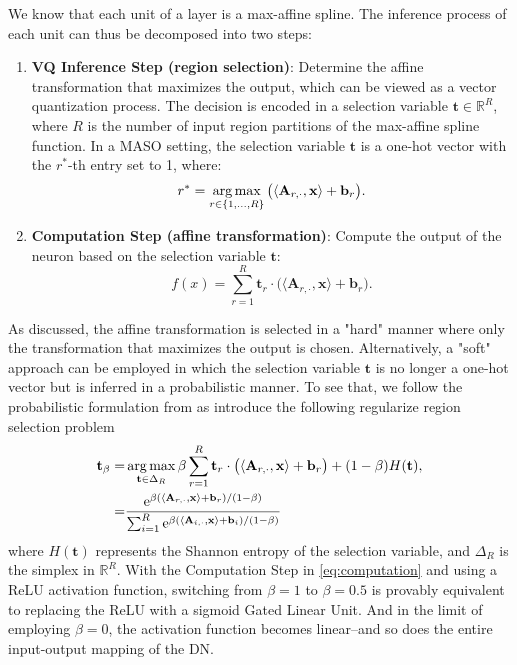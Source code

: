 We know that each unit of a layer is a max-affine spline. The inference process of each unit can thus be decomposed into two steps:
\begin{enumerate}
    \item \textbf{VQ Inference Step (region selection)}: Determine the affine transformation that maximizes the output, which can be viewed as a vector quantization process. The decision is encoded in a selection variable $\mathbf{t} \in \mathbb{R}^R$, where $R$ is the number of input region partitions of the max-affine spline function. In a MASO setting, the selection variable $\mathbf{t}$ is a one-hot vector with the $r^*$-th entry set to 1, where:
    \begin{equation}
        r^* = \operatorname*{arg\,max}_{r \in \{1, \dots, R\}} \big( \langle \mathbf{A}_{r,\cdot}, \mathbf{x} \rangle + \mathbf{b}_r \big).
    \end{equation}
    \item \textbf{Computation Step (affine transformation)}: Compute the output of the neuron based on the selection variable \( \mathbf{t} \):
    \begin{equation}\label{eq:computation}
        f(x) = \sum_{r=1}^R \mathbf{t}_r \cdot \big( \langle \mathbf{A}_{r,\cdot}, \mathbf{x} \rangle + \mathbf{b}_r \big).
    \end{equation}
\end{enumerate}
As discussed, the affine transformation is selected in a "hard" manner where only the transformation that maximizes the output is chosen. Alternatively, a "soft" approach can be employed in which the selection variable $\mathbf{t}$ is no longer a one-hot vector but is inferred in a probabilistic manner. To see that, we follow the probabilistic formulation from \cite{balestriero2018hard} as introduce the following regularize region selection problem
\begin{align}\label{eq:svq}
        \mathbf{t}_{\beta} =& \operatorname*{arg\,max}_{\mathbf{t} \in \Delta_R}\beta \sum_{r=1}^R \mathbf{t}_r \cdot \big( \langle \mathbf{A}_{r,\cdot}, \mathbf{x} \rangle + \mathbf{b}_r \big) + (1-\beta) H(\mathbf{t}),\\
        =&\frac{\mathrm{e}^{\beta(\langle \mathbf{A}_{r,\cdot}, \mathbf{x} \rangle + \mathbf{b}_r)/(1-\beta)}}{\sum_{i=1}^R \mathrm{e}^{\beta(\langle \mathbf{A}_{i,\cdot}, \mathbf{x} \rangle + \mathbf{b}_i)/(1-\beta)}}\nonumber
    \end{align}
    where $H(\mathbf{t})$ represents the Shannon entropy of the selection variable, and $\Delta_R$ is the simplex in $\mathbb{R}^R$. With the Computation Step in \cref{eq:computation} and using a ReLU activation function, switching from $\beta=1$ to $\beta=0.5$ is provably equivalent to replacing the ReLU with a sigmoid Gated Linear Unit. And in the limit of employing $\beta=0$, the activation function becomes linear--and so does the entire input-output mapping of the DN.

